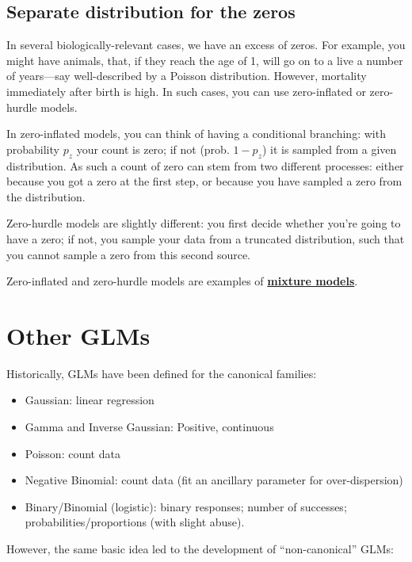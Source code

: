\documentclass[
  letterpaper,
  DIV=11,
  numbers=noendperiod]{scrreprt}
\providecommand{\tightlist}{%
  \setlength{\itemsep}{0pt}\setlength{\parskip}{0pt}}\usepackage{longtable,booktabs,array}
\begin{document}
\subsection{Separate distribution for the
zeros}\label{separate-distribution-for-the-zeros}

In several biologically-relevant cases, we have an excess of zeros. For
example, you might have animals, that, if they reach the age of 1, will
go on to a live a number of years---say well-described by a Poisson
distribution. However, mortality immediately after birth is high. In
such cases, you can use zero-inflated or zero-hurdle models.

In zero-inflated models, you can think of having a conditional
branching: with probability \(p_z\) your count is zero; if not (prob.
\(1-p_z\)) it is sampled from a given distribution. As such a count of
zero can stem from two different processes: either because you got a
zero at the first step, or because you have sampled a zero from the
distribution.

Zero-hurdle models are slightly different: you first decide whether
you're going to have a zero; if not, you sample your data from a
truncated distribution, such that you cannot sample a zero from this
second source.

Zero-inflated and zero-hurdle models are examples of
\href{https://en.wikipedia.org/wiki/Mixture_model}{\textbf{mixture
models}}.

\section{Other GLMs}\label{other-glms}

Historically, GLMs have been defined for the canonical families:

\begin{itemize}
\tightlist
\item
  Gaussian: linear regression
\item
  Gamma and Inverse Gaussian: Positive, continuous
\item
  Poisson: count data
\item
  Negative Binomial: count data (fit an ancillary parameter for
  over-dispersion)
\item
  Binary/Binomial (logistic): binary responses; number of successes;
  probabilities/proportions (with slight abuse).
\end{itemize}

However, the same basic idea led to the development of ``non-canonical''
GLMs:
\end{document}
